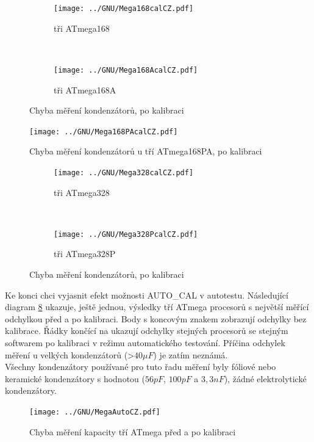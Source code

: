 \begin{figure}[H]
  \begin{subfigure}[b]{.5\textwidth}
    \centering
    \texttt{[image: ../GNU/Mega168calCZ.pdf]}
    \caption{tři ATmega168}
    \label{fig:mega168cal}
  \end{subfigure}
  ~
  \begin{subfigure}[b]{.5\textwidth}
    \centering
    \texttt{[image: ../GNU/Mega168AcalCZ.pdf]}
    \caption{tři ATmega168A}
    \label{fig:mega168Acal}
  \end{subfigure}
  \caption{Chyba měření kondenzátorů, po kalibraci}
\end{figure}

\begin{figure}[H]
\centering
\texttt{[image: ../GNU/Mega168PAcalCZ.pdf]}
\caption{Chyba měření kondenzátorů u tří ATmega168PA, po kalibraci}
\label{fig:mega168PAcal}
\end{figure}

\begin{figure}[H]
  \begin{subfigure}[b]{.5\textwidth}
    \centering
    \texttt{[image: ../GNU/Mega328calCZ.pdf]}
    \caption{tři ATmega328}
    \label{fig:mega328cal}
  \end{subfigure}
  ~
  \begin{subfigure}[b]{.5\textwidth}
    \centering
    \texttt{[image: ../GNU/Mega328PcalCZ.pdf]}
    \caption{tři ATmega328P}
    \label{fig:mega328Pcal}
  \end{subfigure}
  \caption{Chyba měření kondenzátorů, po kalibraci}
\end{figure}

Ke konci chci vyjasnit efekt možnosti AUTO\_CAL v autotestu.
Následující diagram \ref{fig:MegaAuto} ukazuje, ještě jednou, výsledky tří ATmega procesorů
s největší měřící odchylkou před a po kalibraci.
Body s koncovým znakem  zobrazují odchylky bez kalibrace.
Řádky končící na  ukazují odchylky stejných procesorů
se stejným softwarem po kalibraci v režimu automatického testování.
Příčina odchylek měření u velkých kondenzátorů (\textgreater\(40\mu F\))  je
zatím neznámá.\\ Všechny kondenzátory používané pro tuto řadu měření byly
fóliové nebo keramické kondenzátory s hodnotou (\(56pF\), \(100pF\) a \(3,3nF\)),
žádné elektrolytické kondenzátory.

\begin{figure}[H]
\centering
\texttt{[image: ../GNU/MegaAutoCZ.pdf]}
\caption{Chyba měření kapacity tří ATmega před a po kalibraci}
\label{fig:MegaAuto}
\end{figure}

